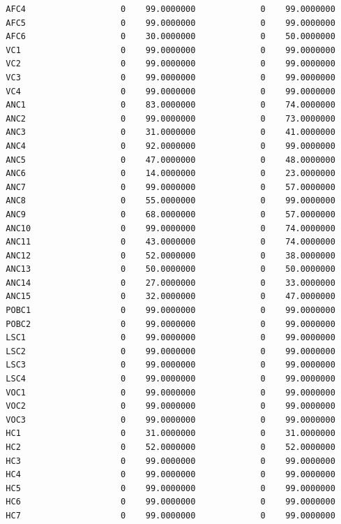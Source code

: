 \documentclass[
  11pt,
  a4paper,
  DIV=12,captions=tableheading,oneside,titlepage]{scrbook}
\begin{document}
\begin{verbatim}
  AFC4                   0    99.0000000             0    99.0000000 
  AFC5                   0    99.0000000             0    99.0000000 
  AFC6                   0    30.0000000             0    50.0000000 
  VC1                    0    99.0000000             0    99.0000000 
  VC2                    0    99.0000000             0    99.0000000 
  VC3                    0    99.0000000             0    99.0000000 
  VC4                    0    99.0000000             0    99.0000000 
  ANC1                   0    83.0000000             0    74.0000000 
  ANC2                   0    99.0000000             0    73.0000000 
  ANC3                   0    31.0000000             0    41.0000000 
  ANC4                   0    92.0000000             0    99.0000000 
  ANC5                   0    47.0000000             0    48.0000000 
  ANC6                   0    14.0000000             0    23.0000000 
  ANC7                   0    99.0000000             0    57.0000000 
  ANC8                   0    55.0000000             0    99.0000000 
  ANC9                   0    68.0000000             0    57.0000000 
  ANC10                  0    99.0000000             0    74.0000000 
  ANC11                  0    43.0000000             0    74.0000000 
  ANC12                  0    52.0000000             0    38.0000000 
  ANC13                  0    50.0000000             0    50.0000000 
  ANC14                  0    27.0000000             0    33.0000000 
  ANC15                  0    32.0000000             0    47.0000000 
  POBC1                  0    99.0000000             0    99.0000000 
  POBC2                  0    99.0000000             0    99.0000000 
  LSC1                   0    99.0000000             0    99.0000000 
  LSC2                   0    99.0000000             0    99.0000000 
  LSC3                   0    99.0000000             0    99.0000000 
  LSC4                   0    99.0000000             0    99.0000000 
  VOC1                   0    99.0000000             0    99.0000000 
  VOC2                   0    99.0000000             0    99.0000000 
  VOC3                   0    99.0000000             0    99.0000000 
  HC1                    0    31.0000000             0    31.0000000 
  HC2                    0    52.0000000             0    52.0000000 
  HC3                    0    99.0000000             0    99.0000000 
  HC4                    0    99.0000000             0    99.0000000 
  HC5                    0    99.0000000             0    99.0000000 
  HC6                    0    99.0000000             0    99.0000000 
  HC7                    0    99.0000000             0    99.0000000 

\end{verbatim}
\end{document}
